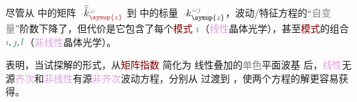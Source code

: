 尽管从  中的矩阵 $\xint{\begin{smallmatrix} ~ \\ {}^{}_{\mathcolor{gray}{-}} \\ ~ \end{smallmatrix}}{15}{\bar{\bar{k}}}_{\textcolor{Maroon}{\symup{z}}}^{\;\! \mathcolor{gray}{\omega}}$ 到  中的标量 $\xint{\begin{smallmatrix} ~ \\ {}^{}_{\mathcolor{gray}{-}} \\ ~ \end{smallmatrix}}{15}{k}_{\symup{z}}^{\;\! \mathcolor{gray}{\omega} \textcolor{PineGreen}{\jmath}}$，波动/\textcolor{PineGreen}{特征方程}的“\textcolor{gray}{自变量}”阶数下降了，但代价是它包含了每个\textcolor{Maroon}{模式} $\textcolor{PineGreen}{\imath}$（\textcolor{Plum}{线性}\textcolor{PineGreen}{晶体光学}），甚至\textcolor{Maroon}{模式}的组合 $\textcolor{PineGreen}{\imath},\textcolor{PineGreen}{\jmath},\textcolor{PineGreen}{l}$（\textcolor{Plum}{非线性}\textcolor{PineGreen}{晶体光学}）。

 表明，当试探解的形式，从\textcolor{Maroon}{矩阵指数}  简化为 \textcolor{PineGreen}{线性叠加}的\textcolor{gray}{单色}\textcolor{PineGreen}{平面波基} 后，\textcolor{Plum}{线性}\textcolor{NavyBlue}{无源}\textcolor{Plum}{齐次}和\textcolor{Plum}{非线性}\textcolor{NavyBlue}{有源}\textcolor{Plum}{非齐次}波动方程，分别从  过渡到 ，使两个方程的解更容易获得。

